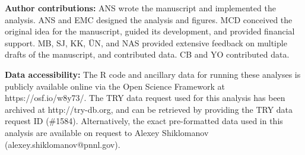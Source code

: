 \documentclass{article}
\begin{document}
\pagebreak

\noindent
\textbf{Author contributions:}
ANS wrote the manuscript and implemented the analysis.
ANS and EMC designed the analysis and figures.
MCD conceived the original idea for the manuscript, guided its development, and provided financial support.
MB, SJ, KK, ÜN, and NAS provided extensive feedback on multiple drafts of the manuscript, and contributed data.
CB and YO contributed data.

\noindent
\textbf{Data accessibility:}
The R code and ancillary data for running these analyses is publicly available online via the Open Science Framework at https://osf.io/w8y73/.
The TRY data request used for this analysis has been archived at http://try-db.org,
and can be retrieved by providing the TRY data request ID (\#1584).
Alternatively, the exact pre-formatted data used in this analysis are available on request to Alexey Shiklomanov (alexey.shiklomanov@pnnl.gov).
\end{document}
